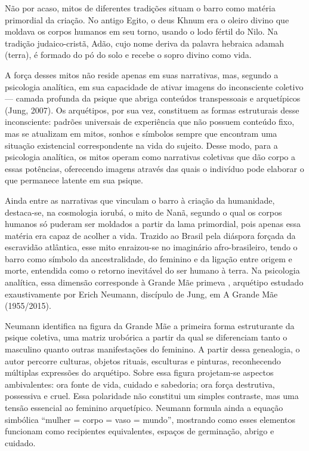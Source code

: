 Não por acaso, mitos de diferentes tradições situam o barro como matéria primordial da criação. No antigo Egito, o deus Khnum era o oleiro divino que moldava os corpos humanos em seu torno, usando o lodo fértil do Nilo. Na tradição judaico-cristã, Adão, cujo nome deriva da palavra hebraica adamah (terra), é formado do pó do solo e recebe o sopro divino como vida. 

A força desses mitos não reside apenas em suas narrativas, mas, segundo a psicologia analítica, em sua capacidade de ativar imagens do inconsciente coletivo — camada profunda da psique que abriga conteúdos transpessoais e arquetípicos (Jung, 2007). Os arquétipos, por sua vez, constituem as formas estruturais desse inconsciente: padrões universais de experiência que não possuem conteúdo fixo, mas se atualizam em mitos, sonhos e símbolos sempre que encontram uma situação existencial correspondente na vida do sujeito. Desse modo, para a psicologia analítica, os mitos operam como narrativas coletivas que dão corpo a essas potências, oferecendo imagens através das quais o indivíduo pode elaborar o que permanece latente em sua psique.

Ainda entre as narrativas que vinculam o barro à criação da humanidade, destaca-se, na cosmologia iorubá, o mito de Nanã, segundo o qual os corpos humanos só puderam ser moldados a partir da lama primordial, pois apenas essa matéria era capaz de acolher a vida. Trazido ao Brasil pela diáspora forçada da escravidão atlântica, esse mito enraizou-se no imaginário afro-brasileiro, tendo o barro como símbolo da ancestralidade, do feminino e da ligação entre origem e morte, entendida como o retorno inevitável do ser humano à terra. Na psicologia analítica, essa dimensão corresponde à Grande Mãe primeva \parencite{zacharias2025}, arquétipo estudado exaustivamente por Erich Neumann, discípulo de Jung, em A Grande Mãe (1955/2015).

Neumann identifica na figura da Grande Mãe a primeira forma estruturante da psique coletiva, uma matriz urobórica a partir da qual se diferenciam tanto o masculino quanto outras manifestações do feminino. A partir dessa genealogia, o autor percorre culturas, objetos rituais, esculturas e pinturas, reconhecendo múltiplas expressões do arquétipo. Sobre essa figura projetam-se aspectos ambivalentes: ora fonte de vida, cuidado e sabedoria; ora força destrutiva, possessiva e cruel. Essa polaridade não constitui um simples contraste, mas uma tensão essencial ao feminino arquetípico. Neumann formula ainda a equação simbólica “mulher = corpo = vaso = mundo”, mostrando como esses elementos funcionam como recipientes equivalentes, espaços de germinação, abrigo e cuidado.

